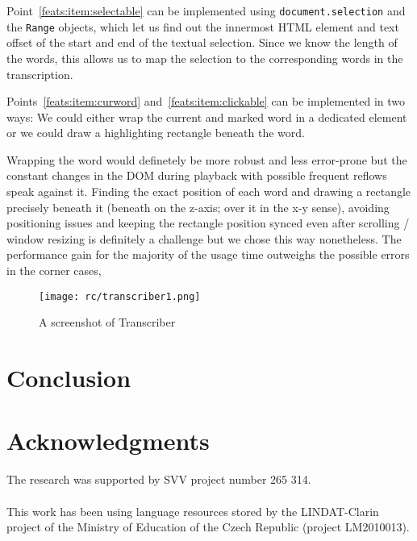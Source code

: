 \documentclass{llncs}
\begin{document}
Point~\ref{feats:item:selectable} can be implemented using
\texttt{document.selection} and the \texttt{Range} objects, which let us find
out the innermost HTML element and text offset of the start and end of the
textual selection. Since we know the length of the words, this allows us to map
the selection to the corresponding words in the transcription.

Points~\ref{feats:item:curword} and~\ref{feats:item:clickable} can be
implemented in two ways: We could either wrap the current and marked word in a
dedicated element or we could draw a highlighting rectangle beneath the word.

Wrapping the word would definetely be more robust and less error-prone but the
constant changes in the DOM during playback with possible frequent reflows speak
against it. Finding the exact position of each word and drawing a rectangle
precisely beneath it (beneath on the z-axis; over it in the x-y sense), avoiding
positioning issues and keeping the rectangle position synced even after scrolling
/ window resizing is definitely a challenge but we chose this way nonetheless.
The performance gain for the majority of the usage time outweighs the possible
errors in the corner cases, 

\begin{figure}[htpb]
\texttt{[image: rc/transcriber1.png]}
\caption{A screenshot of Transcriber}
\label{fig:transcriber1}
\end{figure}





\section{Conclusion}

\section*{Acknowledgments}

The research was supported by SVV project number 265 314.\\
\\
This work has been using language resources stored
by the LINDAT-Clarin project of the Ministry of
Education of the Czech Republic (project LM2010013).
%


\end{document}
